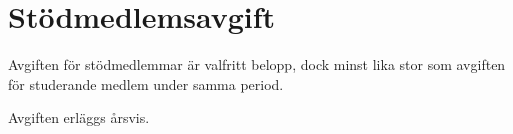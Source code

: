 \section{Stödmedlemsavgift}
Avgiften för stödmedlemmar är valfritt belopp, dock minst lika stor som avgiften för studerande medlem under samma period.

Avgiften erläggs årsvis.

